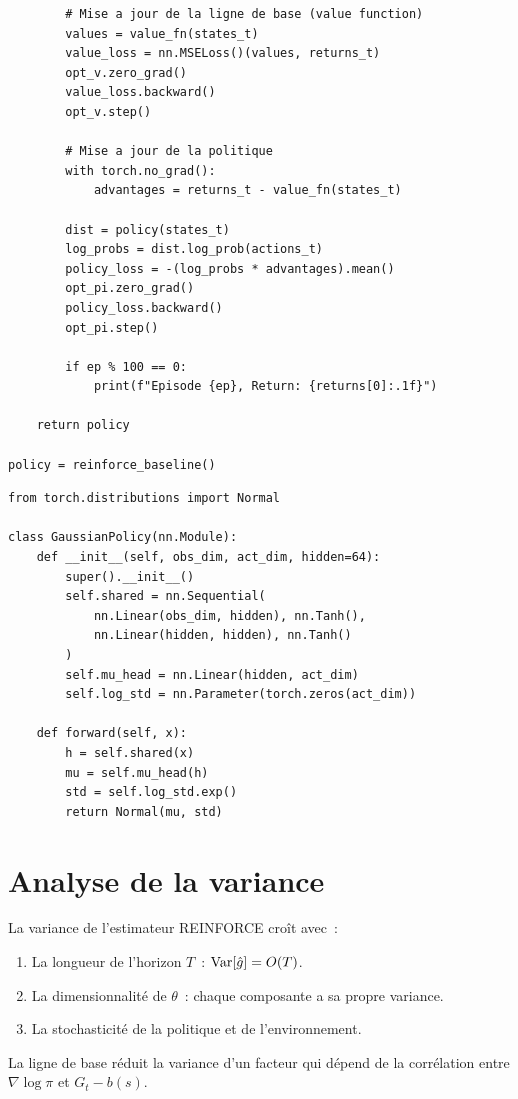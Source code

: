 \begin{codeblock}[title=\textbf{REINFORCE avec ligne de base}]
\begin{verbatim}
        # Mise a jour de la ligne de base (value function)
        values = value_fn(states_t)
        value_loss = nn.MSELoss()(values, returns_t)
        opt_v.zero_grad()
        value_loss.backward()
        opt_v.step()

        # Mise a jour de la politique
        with torch.no_grad():
            advantages = returns_t - value_fn(states_t)

        dist = policy(states_t)
        log_probs = dist.log_prob(actions_t)
        policy_loss = -(log_probs * advantages).mean()
        opt_pi.zero_grad()
        policy_loss.backward()
        opt_pi.step()

        if ep % 100 == 0:
            print(f"Episode {ep}, Return: {returns[0]:.1f}")

    return policy

policy = reinforce_baseline()
\end{verbatim}
\end{codeblock}

\begin{codeblock}[title=\textbf{REINFORCE pour actions continues}]
\begin{verbatim}
from torch.distributions import Normal

class GaussianPolicy(nn.Module):
    def __init__(self, obs_dim, act_dim, hidden=64):
        super().__init__()
        self.shared = nn.Sequential(
            nn.Linear(obs_dim, hidden), nn.Tanh(),
            nn.Linear(hidden, hidden), nn.Tanh()
        )
        self.mu_head = nn.Linear(hidden, act_dim)
        self.log_std = nn.Parameter(torch.zeros(act_dim))

    def forward(self, x):
        h = self.shared(x)
        mu = self.mu_head(h)
        std = self.log_std.exp()
        return Normal(mu, std)
\end{verbatim}
\end{codeblock}

\section{Analyse de la variance}

\begin{theoreme}
La variance de l'estimateur REINFORCE cro\^it avec~:
\begin{enumerate}
    \item La longueur de l'horizon $T$~: $\mathrm{Var}[\hat{g}] = O(T)$.
    \item La dimensionnalit\'e de $\theta$~: chaque composante a sa propre variance.
    \item La stochasticit\'e de la politique et de l'environnement.
\end{enumerate}
La ligne de base r\'eduit la variance d'un facteur qui d\'epend de la corr\'elation
entre $\nabla \log \pi$ et $G_t - b(s)$.
\end{theoreme}

